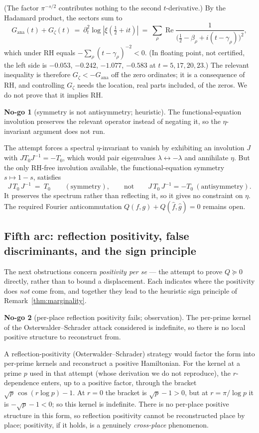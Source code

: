 \documentclass[11pt]{amsart}
\theoremstyle{definition}
\theoremstyle{remark}
\theoremstyle{definition}
\newtheorem{nogo}{No-go}[section]
\renewcommand{\Re}{\operatorname{Re}}
\begin{document}
(The factor $\pi^{-s/2}$ contributes nothing to the second $t$-derivative.) By the Hadamard product, the
sectors sum to
\[
   G_{\mathrm{ana}}(t)+G_\zeta(t)\ =\ \partial_t^2\log|\xi(\tfrac12+it)|
   \ =\ \sum_\rho\Re\frac{1}{\bigl(\tfrac12-\beta_\rho+i(t-\gamma_\rho)\bigr)^2},
\]
which under RH equals $-\sum_\rho(t-\gamma_\rho)^{-2}<0$. (In floating point, not certified, the left side is $-0.053$,
$-0.242$, $-1.077$, $-0.583$ at $t=5,17,20,23$.) The relevant inequality is therefore
$G_\zeta<-G_{\mathrm{ana}}$ off the zero ordinates; it is a consequence of RH, and controlling $G_\zeta$
needs the location, real parts included, of the zeros. We do not prove that it implies RH.

\begin{nogo}[symmetry is not antisymmetry; heuristic]\label{ng:antisym}
The functional-equation involution preserves the relevant operator instead of negating it, so the
$\eta$-invariant argument does not run.
\end{nogo}
\noindent The attempt forces a spectral $\eta$-invariant to vanish by exhibiting an involution $J$ with
$JT_0J^{-1}=-T_0$, which would pair eigenvalues $\lambda\leftrightarrow-\lambda$ and annihilate $\eta$. But
the only RH-free involution available, the functional-equation symmetry $s\mapsto1-s$, satisfies
\[
   J\,T_0\,J^{-1}\ =\ T_0 \qquad(\text{symmetry}),\qquad\text{not}\qquad J\,T_0\,J^{-1}=-T_0\ (\text{antisymmetry}).
\]
It preserves the spectrum rather than reflecting it, so it gives no constraint on $\eta$. The required
Fourier anticommutation $Q(f,g)+Q(\widehat f,\widehat g)=0$ remains open.

\subsection{Fifth arc: reflection positivity, false discriminants, and the sign
principle}\label{sec:arcE}

The next obstructions concern \emph{positivity per se} --- the attempt to prove $Q\succeq0$ directly,
rather than to bound a displacement. Each indicates where the positivity does \emph{not} come from, and
together they lead to the heuristic sign principle of Remark~\ref{thm:marginality}.

\begin{nogo}[per-place reflection positivity fails; observation]\label{ng:perplace}
The per-prime kernel of the Osterwalder--Schrader attack considered is indefinite, so there is no local
positive structure to reconstruct from.
\end{nogo}
\noindent A reflection-positivity (Osterwalder--Schrader) strategy would factor the form into per-prime
kernels and reconstruct a positive Hamiltonian. For the kernel at a prime $p$ used in that attempt (whose
derivation we do not reproduce), the $r$-dependence enters, up to a positive factor, through the bracket
$\sqrt p\,\cos(r\log p)-1$. At $r=0$ the bracket is $\sqrt p-1>0$, but at $r=\pi/\log p$ it is
$-\sqrt p-1<0$; so this kernel is indefinite. There is no per-place positive structure in this form, so reflection positivity cannot
be reconstructed place by place; positivity, if it holds, is a genuinely \emph{cross-place} phenomenon.
\end{document}
